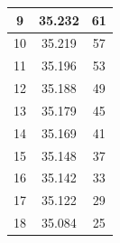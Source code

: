 \documentclass{article}
\theoremstyle{mytheoremstyle}
\theoremstyle{mytheoremstyle}
\theoremstyle{myproblemstyle}
\begin{document}
\begin{table}[h]
\begin{tabular}{|c|c|c|}
	\rowcolor[HTML]{F9CDAD} 
	9                & 35.232                                                                            & 61                                                                                    \\ \hline
	\rowcolor[HTML]{F9CDAD} 
	10               & 35.219                                                                            & 57                                                                                    \\ \hline
	\rowcolor[HTML]{F9CDAD} 
	11               & 35.196                                                                            & 53                                                                                    \\ \hline
	\rowcolor[HTML]{F9CDAD} 
	12               & 35.188                                                                            & 49                                                                                    \\ \hline
	\rowcolor[HTML]{F9CDAD} 
	13               & 35.179                                                                            & 45                                                                                    \\ \hline
	\rowcolor[HTML]{F9CDAD} 
	14               & 35.169                                                                            & 41                                                                                    \\ \hline
	\rowcolor[HTML]{F9CDAD} 
	15               & 35.148                                                                            & 37                                                                                    \\ \hline
	\rowcolor[HTML]{F9CDAD} 
	16               & 35.142                                                                            & 33                                                                                    \\ \hline
	\rowcolor[HTML]{F9CDAD} 
	17               & 35.122                                                                            & 29                                                                                    \\ \hline
	\rowcolor[HTML]{F9CDAD} 
	18               & 35.084                                                                            & 25                                                                                    \\ \hline

\end{tabular}
\end{table}
\end{document}
